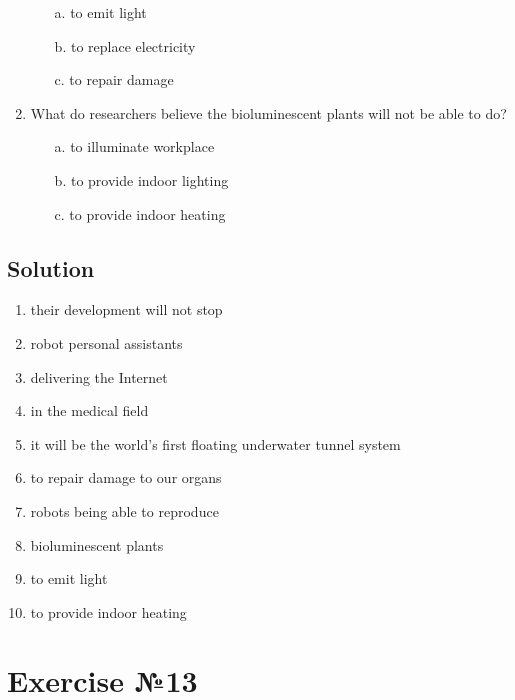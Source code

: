\begin{enumerate}
            \begin{enumerate}
                  \item[a.] to emit light
                  \item[b.] to replace electricity
                  \item[c.] to repair damage
            \end{enumerate}
      \item What do researchers believe the bioluminescent plants will not be able to do?
            \begin{enumerate}
                  \item[a.] to illuminate workplace
                  \item[b.] to provide indoor lighting
                  \item[c.] to provide indoor heating
            \end{enumerate}
\end{enumerate}

\subsection*{Solution}
\begin{enumerate}[label=\textbf{\alph*.}]
      \item their development will not stop
      \item robot personal assistants
      \item delivering the Internet
      \item in the medical field
      \item it will be the world's first floating underwater tunnel system
      \item to repair damage to our organs
      \item robots being able to reproduce
      \item bioluminescent plants
      \item to emit light
      \item to provide indoor heating
\end{enumerate}

\section{Exercise №13}
